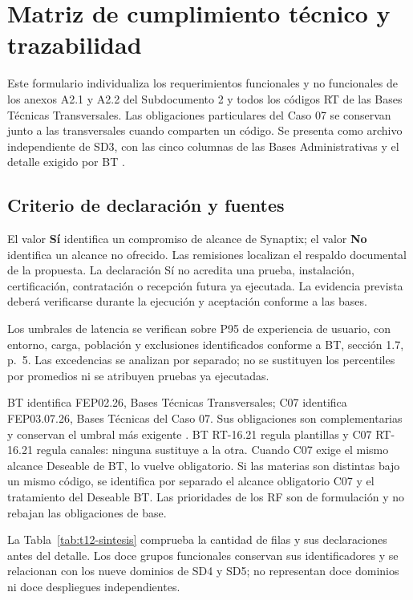 \chapter*{Matriz de cumplimiento técnico y trazabilidad}
Este formulario individualiza los requerimientos funcionales y no funcionales
de los anexos A2.1 y A2.2 del Subdocumento 2 y todos los códigos RT de las
Bases Técnicas Transversales. Las obligaciones particulares del Caso 07
se conservan junto a las transversales cuando comparten un código.
Se presenta como archivo independiente de SD3, con las cinco columnas de
las Bases Administrativas \parencite[Formulario T-12, p.~62]{bases-admin}
y el detalle exigido por BT \parencite[sec.~1.5, p.~4]{bases-transversales}.

\section*{Criterio de declaración y fuentes}
El valor \textbf{Sí} identifica un compromiso de alcance de Synaptix; el valor \textbf{No} identifica un alcance no ofrecido. Las remisiones localizan el respaldo documental de la propuesta. La declaración Sí no acredita una prueba, instalación, certificación, contratación o recepción futura ya ejecutada. La evidencia prevista deberá verificarse durante la ejecución y aceptación conforme a las bases.

Los umbrales de latencia se verifican sobre P95 de experiencia de usuario, con entorno, carga, población y exclusiones identificados conforme a BT, sección 1.7, p.~5. Las excedencias se analizan por separado; no se sustituyen los percentiles por promedios ni se atribuyen pruebas ya ejecutadas.

BT identifica FEP02.26, Bases Técnicas Transversales; C07 identifica FEP03.07.26, Bases Técnicas del Caso 07. Sus obligaciones son complementarias y conservan el umbral más exigente \parencites[art.~5, p.~6]{bases-admin}[cap.~15]{caso07}. BT RT-16.21 regula plantillas y C07 RT-16.21 regula canales: ninguna sustituye a la otra. Cuando C07 exige el mismo alcance Deseable de BT, lo vuelve obligatorio. Si las materias son distintas bajo un mismo código, se identifica por separado el alcance obligatorio C07 y el tratamiento del Deseable BT. Las prioridades de los RF son de formulación y no rebajan las obligaciones de base.

La Tabla~\ref{tab:t12-sintesis} comprueba la cantidad de filas y sus declaraciones antes del detalle. Los doce grupos funcionales conservan sus identificadores y se relacionan con los nueve dominios de SD4 y SD5; no representan doce dominios ni doce despliegues independientes.


